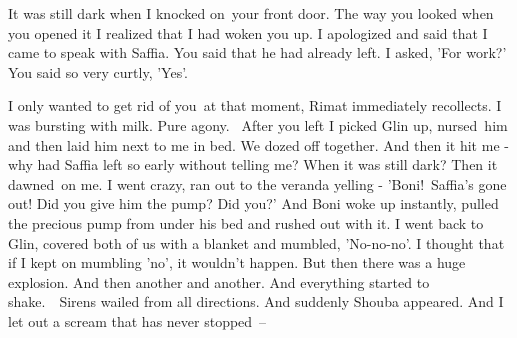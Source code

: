 \documentclass[letterpaper]{article}
\begin{document}
{\textquotedbl}It was still dark when I knocked on\ your front door. The way you looked when you opened it I realized
that I had woken you up. I apologized and said that I came to speak with Saffia. You said that he had already left. I
asked, 'For work?' You said so very curtly, 'Yes'.{\textquotedbl} 

{\textquotedbl}I only wanted to get rid of you\ at that moment,{\textquotedbl} Rimat immediately recollects.
{\textquotedbl}I was bursting with milk. Pure agony. ~After you left I picked Glin up, nursed\textcolor{red}{\ }him and
then laid him next to me in bed. We dozed off together. And then it hit me - why had Saffia left so early without
telling me? When it was still dark? Then it dawned\textcolor{red}{\ }on me. I went crazy, ran out to the veranda
yelling - 'Boni!\ Saffia's gone out! Did you give him the pump? Did you?' And Boni woke up instantly, pulled the
precious pump from under his bed and rushed out with it. I went back to Glin, covered both of us with a blanket and
mumbled, 'No-no-no'. I thought that if I kept on mumbling 'no', it wouldn't happen. But then there was a huge
explosion. And then another and another. And everything started to shake.\ \ Sirens wailed from all directions. And
suddenly Shouba appeared. And I let out a scream that has never stopped\ {}--{\textquotedbl}
\end{document}
